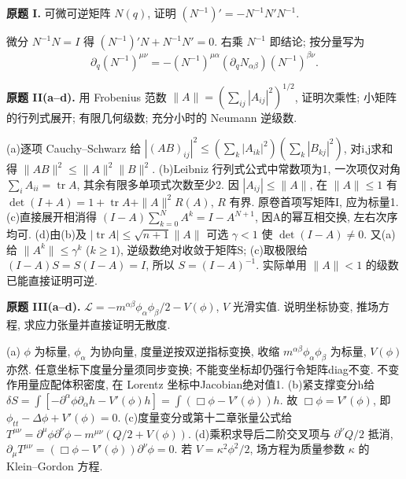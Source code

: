 \begin{exercise}\label{ps:11I}
\textbf{原题 I.} 可微可逆矩阵 $N(q)$, 证明 $(N^{-1})'=-N^{-1}N'N^{-1}$.
\end{exercise}
\begin{solution}
微分 $N^{-1}N=I$ 得 $(N^{-1})'N+N^{-1}N'=0$. 右乘 $N^{-1}$ 即结论; 按分量写为
\[
\partial_q(N^{-1})^{\mu\nu}=-(N^{-1})^{\mu\alpha}(\partial_qN_{\alpha\beta})(N^{-1})^{\beta\nu}.
\]
\end{solution}
\begin{exercise}\label{ps:11II}
\textbf{原题 II(a--d).} 用 Frobenius 范数 $\|A\|=(\sum_{ij}|A_{ij}|^2)^{1/2}$, 证明次乘性; 小矩阵的行列式展开; 有限几何级数; 充分小时的 Neumann 逆级数.
\end{exercise}
\begin{solution}
(a)逐项 Cauchy--Schwarz 给 $|(AB)_{ij}|^2\le(\sum_k|A_{ik}|^2)(\sum_k|B_{kj}|^2)$, 对i,j求和得 $\|AB\|^2\le\|A\|^2\|B\|^2$.
(b)Leibniz 行列式公式中常数项为1, 一次项仅对角 $\sum_iA_{ii}=\operatorname{tr}A$, 其余有限多单项式次数至少2. 因 $|A_{ij}|\le\|A\|$, 在 $\|A\|\le1$ 有
$\det(I+A)=1+\operatorname{tr}A+\|A\|^2R(A)$, $R$ 有界. 原卷首项写矩阵I, 应为标量1.
(c)直接展开相消得 $(I-A)\sum_{k=0}^NA^k=I-A^{N+1}$, 因A的幂互相交换, 左右次序均可.
(d)由(b)及 $|\operatorname{tr}A|\le\sqrt{n+1}\|A\|$ 可选 $\gamma<1$ 使 $\det(I-A)\ne0$. 又(a)给 $\|A^k\|\le\gamma^k$ ($k\ge1$), 逆级数绝对收敛于矩阵S; (c)取极限给 $(I-A)S=S(I-A)=I$, 所以 $S=(I-A)^{-1}$. 实际单用 $\|A\|<1$ 的级数已能直接证明可逆.
\end{solution}
\begin{exercise}\label{ps:11III}
\textbf{原题 III(a--d).} $\mathcal L=-m^{\alpha\beta}\phi_\alpha\phi_\beta/2-V(\phi)$, $V$ 光滑实值. 说明坐标协变, 推场方程, 求应力张量并直接证明无散度.
\end{exercise}
\begin{solution}
(a) $\phi$ 为标量, $\phi_\alpha$ 为协向量, 度量逆按双逆指标变换, 收缩 $m^{\alpha\beta}\phi_\alpha\phi_\beta$ 为标量, $V(\phi)$ 亦然. 任意坐标下度量分量须同步变换; 不能变坐标却仍强行令矩阵diag不变. 不变作用量应配体积密度, 在 Lorentz 坐标中Jacobian绝对值1.
(b)紧支撑变分h给 $\delta S=\int[-\partial^\alpha\phi\partial_\alpha h-V'(\phi)h]=\int(\Box\phi-V'(\phi))h$. 故 $\Box\phi=V'(\phi)$, 即 $\phi_{tt}-\Delta\phi+V'(\phi)=0$.
(c)度量变分或第十二章张量公式给
$T^{\mu\nu}=\partial^\mu\phi\partial^\nu\phi-m^{\mu\nu}(Q/2+V(\phi))$.
(d)乘积求导后二阶交叉项与 $\partial^\nu Q/2$ 抵消,
$\partial_\mu T^{\mu\nu}=(\Box\phi-V'(\phi))\partial^\nu\phi=0$.
若 $V=\kappa^2\phi^2/2$, 场方程为质量参数 $\kappa$ 的 Klein--Gordon 方程.
\end{solution}
